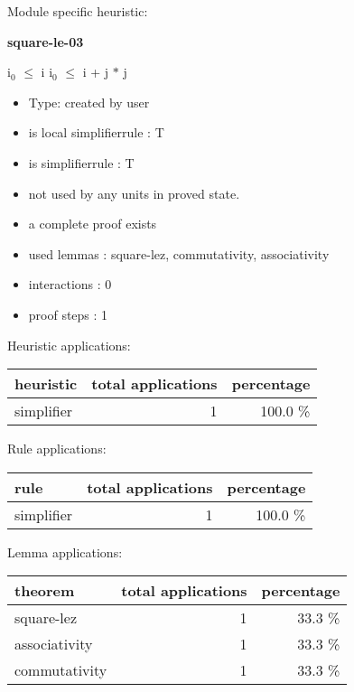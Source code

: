\documentclass[a4paper]{article}
\begin{document}
Module specific heuristic:

\pagebreak

{\LARGE\bf square-le-03}\label{lemma-square-le-03}

\medskip

 \Fol $\mbox{i}_{0}$ $\le$ i \Imp $\mbox{i}_{0}$ $\le$ i + j $*$ j

\begin{itemize}

\item Type: created by user

\item is local simplifierrule : T
\item is simplifierrule : T
\item not used by any units in proved state.
\item       a complete proof exists
\item       used lemmas  : square-lez, commutativity, associativity
\item       interactions : 0
\item       proof steps  : 1
\end{itemize}

\medskip


Heuristic applications:

\begin{supertabular}{l|r|r}
heuristic	& total applications & percentage \\ \hline
simplifier & 1 & 100.0 \% \\

\end{supertabular}

Rule applications:

\begin{supertabular}{l|r|r}
rule	        & total applications & percentage \\ \hline
simplifier & 1 & 100.0 \% \\

\end{supertabular}

Lemma applications:

\begin{supertabular}{l|r|r}
theorem	        & total applications & percentage \\ \hline
square-lez & 1 & 33.3 \% \\
associativity & 1 & 33.3 \% \\
commutativity & 1 & 33.3 \% \\

\end{supertabular}
\end{document}
